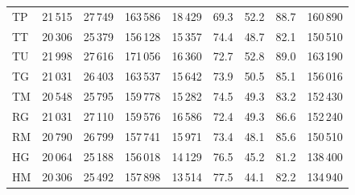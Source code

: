 \begin{minipage}{\textwidth}
\begin{tabular*}{\textwidth}{@{\extracolsep{\fill}}lrrrrrrrr@{}}
TP & 21\,515 & 27\,749 & 163\,586 & 18\,429 & 69.3 & 52.2 & 88.7 & 160\,890\\
TT & 20\,306 & 25\,379 & 156\,128 & 15\,357 & 74.4 & 48.7 & 82.1 & 150\,510\\
TU & 21\,998 & 27\,616 & 171\,056 & 16\,360 & 72.7 & 52.8 & 89.0 & 163\,190\\
TG & 21\,031 & 26\,403 & 163\,537 & 15\,642 & 73.9 & 50.5 & 85.1 & 156\,016\\
TM & 20\,548 & 25\,795 & 159\,778 & 15\,282 & 74.5 & 49.3 & 83.2 & 152\,430\\
RG & 21\,031 & 27\,110 & 159\,576 & 16\,586 & 72.4 & 49.3 & 86.6 & 152\,240\\
RM & 20\,790 & 26\,799 & 157\,741 & 15\,971 & 73.4 & 48.1 & 85.6 & 150\,510\\
HG & 20\,064 & 25\,188 & 156\,018 & 14\,129 & 76.5 & 45.2 & 81.2 & 138\,400\\
HM & 20\,306 & 25\,492 & 157\,898 & 13\,514 & 77.5 & 44.1 & 82.2 & 134\,940\\
\bottomrule\end{tabular*}
\end{minipage}\par\medskip
